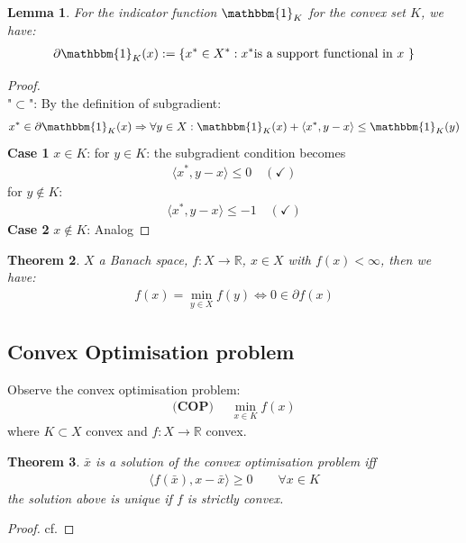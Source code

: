 \documentclass[a4paper,12pt,oneside,fleqn]{book}
\newtheorem{theorem}{Theorem}[section]
\newtheorem{lemma}[theorem]{Lemma}
\theoremstyle{definition}
\theoremstyle{remark}
\begin{document}
\begin{lemma}
	For the indicator function $\mathbbm{1}_{K}$ for the convex set $K$, we have:
	\begin{align*}
		\partial \mathbbm{1}_{K}(x) := \{x^* \in X^*: x^* \text{is a support functional in $x$ } \}
	\end{align*}
\end{lemma}
\begin{proof}\quad\\
"$\subset$": By the definition of subgradient:
\begin{align*}
	x^* \in \partial \mathbbm{1}_{K}(x)
	&\Rightarrow \forall y \in X: \mathbbm{1}_{K}(x) + \langle x^*, y - x \rangle  \le \mathbbm{1}_{K}(y)\\
\end{align*}
\textbf{Case 1} $x \in K$: for $y \in K$: the subgradient condition becomes
\begin{align*}
	\langle x^*, y - x \rangle \le 0 \quad (\checkmark)
\end{align*}
for $y \notin K$:
\begin{align*}
	\langle x^*, y - x\rangle \le - 1 \quad (\checkmark)
\end{align*}
\textbf{Case 2} $x \notin K$:  Analog 
\end{proof}

\begin{theorem}
	$X$ a Banach space, $f: X \rightarrow \mathbb{R}$, $x \in X$ with $f(x) < \infty$, then we have:
	\begin{align*}
		f(x) = \min_{y \in X} f(y) \Leftrightarrow 0 \in \partial f(x)
	\end{align*}
\end{theorem}


\subsection{Convex Optimisation problem}
Observe the convex optimisation problem:
\begin{align*}
\textbf{(COP) } \quad
	\min_{x \in K} f(x)
\end{align*}
where $K \subset X$ convex and $f : X \rightarrow \mathbb{R}$ convex.

\begin{theorem}
	$\bar{x}$ is a solution of the convex optimisation problem iff
	\begin{align*}
		\langle f(\bar{x}) , x - \bar{x} \rangle \geq 0 \qquad \forall x \in K
	\end{align*}
	the solution above is unique if $f$ is strictly convex.
\end{theorem}
\begin{proof}
	cf. 
\end{proof}
\end{document}
